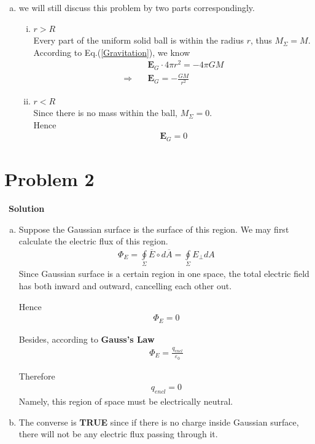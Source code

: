 \documentclass[12pt,a4paper]{article}
\begin{document}
\begin{enumerate}[(a)]
    \item we will still discuss this problem by two parts correspondingly.
\begin{enumerate}[i)]
    \item $r > R$ \\
    Every part of the uniform solid ball is within the radius $r$, thus $M_{\Sigma} = M$. \\
    According to Eq.(\ref{Gravitation}), we know
    \begin{align}
        &\mathbf{E}_{G} \cdot 4\pi r^2 = -4\pi GM \\
        \Rightarrow\quad &\mathbf{E}_{G} = -\frac{GM}{r^2}
    \end{align}
    
    \item $r < R$ \\
    Since there is no mass within the ball, $M_{\Sigma} = 0$. \\
    Hence
    \begin{align}
        \mathbf{E}_{G} = 0
    \end{align}
\end{enumerate}
\end{enumerate}

\section*{\large \textbf{Problem 2}}~{\textbf{Solution}}

\begin{enumerate}[(a)]
    \item Suppose the Gaussian surface is the surface of this region. We may first calculate the electric flux of this region.
    \begin{align}
        \Phi_E = \oint\limits_{\Sigma} \overline{E} \circ d\overline{A} = \oint\limits_{\Sigma} E_{\perp} dA
    \end{align}
    Since Gaussian surface is a certain region in one space, the total electric field has both inward and outward, cancelling each other out.
    
    Hence
    \begin{align}
        \Phi_E = 0
    \end{align}
    
    Besides, according to \textbf{Gauss's Law}
    \begin{align}
        \Phi_E = \frac{q_{encl}}{\varepsilon_0}
    \end{align}
    
    Therefore
    \begin{align}
        q_{encl} = 0
    \end{align}
    Namely, this region of space must be electrically neutral.
    
    \item The converse is \textbf{TRUE} since if there is no charge inside Gaussian surface, there will not be any electric flux passing through it.
\end{enumerate}
\end{document}
